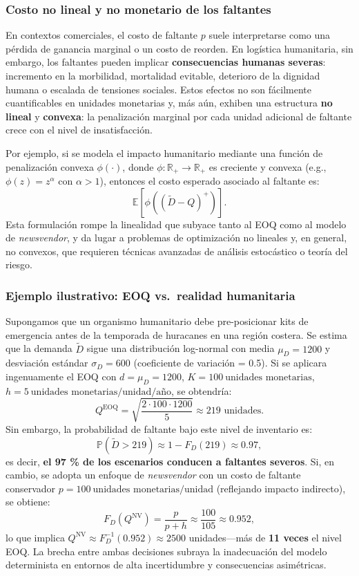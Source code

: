 \documentclass[
  spanish,
  us-letterpaper,
]{scrreprt}
\numberwithin{equation}{section}
\begin{document}
\subsubsection{Costo no lineal y no monetario de los
faltantes}\label{costo-no-lineal-y-no-monetario-de-los-faltantes}

En contextos comerciales, el costo de faltante \(p\) suele interpretarse
como una pérdida de ganancia marginal o un costo de reorden. En
logística humanitaria, sin embargo, los faltantes pueden implicar
\textbf{consecuencias humanas severas}: incremento en la morbilidad,
mortalidad evitable, deterioro de la dignidad humana o escalada de
tensiones sociales. Estos efectos no son fácilmente cuantificables en
unidades monetarias y, más aún, exhiben una estructura \textbf{no
lineal} y \textbf{convexa}: la penalización marginal por cada unidad
adicional de faltante crece con el nivel de insatisfacción.

Por ejemplo, si se modela el impacto humanitario mediante una función de
penalización convexa \(\phi(\cdot)\), donde
\(\phi: \mathbb{R}_+ \to \mathbb{R}_+\) es creciente y convexa (e.g.,
\(\phi(z) = z^\alpha\) con \(\alpha > 1\)), entonces el costo esperado
asociado al faltante es: \[
\mathbb{E}[\phi((\tilde{D} - Q)^+)].
\] Esta formulación rompe la linealidad que subyace tanto al EOQ como al
modelo de \emph{newsvendor}, y da lugar a problemas de optimización no
lineales y, en general, no convexos, que requieren técnicas avanzadas de
análisis estocástico o teoría del riesgo.

\subsubsection{Ejemplo ilustrativo: EOQ vs.~realidad
humanitaria}\label{ejemplo-ilustrativo-eoq-vs.-realidad-humanitaria}

Supongamos que un organismo humanitario debe pre-posicionar kits de
emergencia antes de la temporada de huracanes en una región costera. Se
estima que la demanda \(\tilde{D}\) sigue una distribución log-normal
con media \(\mu_D = 1200\) y desviación estándar \(\sigma_D = 600\)
(coeficiente de variación = 0.5). Si se aplicara ingenuamente el EOQ con
\(d = \mu_D = 1200\), \(K = 100~\text{unidades monetarias}\),
\(h = 5~\text{unidades monetarias/unidad/año}\), se obtendría: \[
Q^{\text{EOQ}} = \sqrt{\frac{2 \cdot 100 \cdot 1200}{5}} \approx 219 \text{ unidades}.
\] Sin embargo, la probabilidad de faltante bajo este nivel de
inventario es: \[
\mathbb{P}(\tilde{D} > 219) \approx 1 - F_D(219) \approx 0.97,
\] es decir, \textbf{el 97 \% de los escenarios conducen a faltantes
severos}. Si, en cambio, se adopta un enfoque de \emph{newsvendor} con
un costo de faltante conservador
\(p = 100~\text{unidades monetarias/unidad}\) (reflejando impacto
indirecto), se obtiene: \[
F_D(Q^{\text{NV}}) = \frac{p}{p + h} \approx \frac{100}{105} \approx 0.952,
\] lo que implica \(Q^{\text{NV}} \approx F_D^{-1}(0.952) \approx 2500\)
unidades---más de \textbf{11 veces} el nivel EOQ. La brecha entre ambas
decisiones subraya la inadecuación del modelo determinista en entornos
de alta incertidumbre y consecuencias asimétricas.
\end{document}
